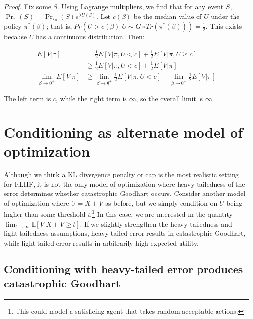 \documentclass{article}
\theoremstyle{plain}
\theoremstyle{definition}
\theoremstyle{remark}
\begin{document}
\emph{Proof.} Fix some \(\beta\). Using Lagrange multipliers, we find
that for any event \(S\),
\(\Pr_\pi(S) = \Pr_{\pi_0}(S) e^{\lambda U(S)}\). Let \(c(\beta)\) be
the median value of \(U\) under the policy \(\pi^*(\beta)\); that is,
\(Pr(U > c(\beta) | U \sim G \circ Tr(\pi^*(\beta))) = \frac 1 2.\) This
exists because \(U\) has a continuous distribution. Then:

\begin{align*}E[V | \pi] &= \frac 1 2 E[V | \pi, U < c] + \frac 1 2 E[V | \pi, U \ge c]
\\ &\ge \frac 1 2 E[V | \pi, U < c] + \frac 1 2 E[V | \pi]
\\ \lim_{\beta \to 0^+} E[V | \pi] &\ge \lim_{\beta \to 0^+} \frac 1 2 E[V | \pi, U < c] + \lim_{\beta \to 0^+} \frac 1 2 E[V | \pi]
\end{align*}

The left term is \(c\), while the right term is \(\infty\), so the
overall limit is \(\infty\).

\section{Conditioning as alternate model of optimization\label{sec:theoretical-conditioning}}

Although we think a KL divergence penalty or cap is the most realistic setting for RLHF, it is not the only model of optimization where heavy-tailedness of the error determines whether catastrophic Goodhart occurs. Consider another model of optimization where $U = X+V$ as before, but we simply condition on $U$ being higher than some threshold $t$.\footnote{This could model a satisficing agent that takes random acceptable actions.} In this case, we are interested in the quantity $\lim_{t \to \infty} \mathbb E[V | X + V \ge t]$. If we slightly strengthen the heavy-tailedness and light-tailedness assumptions, heavy-tailed error results in catastrophic Goodhart, while light-tailed error results in arbitrarily high expected utility.

\subsection{Conditioning with heavy-tailed error produces catastrophic Goodhart}
\end{document}

